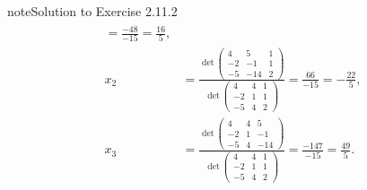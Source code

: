 \documentclass[letterpaper,10pt,english]{jupyterBook}
\begin{document}
\begin{sphinxadmonition}{note}{Solution to Exercise 2.11.2}
\begin{equation*}
\begin{split}
\begin{align*}
    = \frac{-48}{-15} = \frac{16}{5}, \\ 
    x_{2} &= \frac{\det\left(\begin{matrix}4 & 5 & 1\\-2 & -1 & 1\\-5 & -14 & 2\end{matrix}\right)}{\det\left(\begin{matrix}4 & 4 & 1\\-2 & 1 & 1\\-5 & 4 & 2\end{matrix}\right)} 
    = \frac{66}{-15} = - \frac{22}{5}, \\ 
    x_{3} &= \frac{\det\left(\begin{matrix}4 & 4 & 5\\-2 & 1 & -1\\-5 & 4 & -14\end{matrix}\right)}{\det\left(\begin{matrix}4 & 4 & 1\\-2 & 1 & 1\\-5 & 4 & 2\end{matrix}\right)} 
    = \frac{-147}{-15} = \frac{49}{5}. 
\end{align*} \end{split}
\end{equation*}\end{sphinxadmonition}
 \label{_pages/A2_Linear_systems_exercises_solutions:_pages/A2_Linear_systems_exercises_solutions-solution-2}
\end{document}

